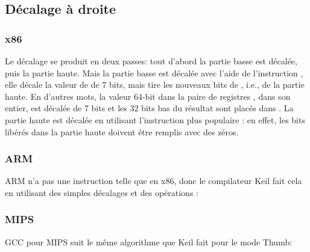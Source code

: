 ﻿\subsection{Décalage à droite}



\subsubsection{x86}






Le décalage se produit en deux passes: tout d'abord la partie basse est décalée,
puis la partie haute.
Mais la partie basse est décalée avec l'aide de l'instruction , elle décale
la valeur de \EAX{} de 7 bits, mais tire les nouveaux bits de \EDX{}, i.e., de la
partie haute.
En d'autres mots, la valeur 64-bit dans la paire de registres , dans
son entier, est décalée de 7 bits et les 32 bits bas du résultat sont placés dans
\EAX{}.
La partie haute est décalée en utilisant l'instruction plus populaire \SHR{}: en
effet, les bits libérés dans la partie haute doivent être remplis avec des zéros.

\subsubsection{ARM}

ARM n'a pas une instruction telle que  en x86, donc le compilateur Keil
fait cela en utilisant des simples décalages et des opérations :





\subsubsection{MIPS}

GCC pour MIPS suit le même algorithme que Keil fait pour le mode Thumb:




